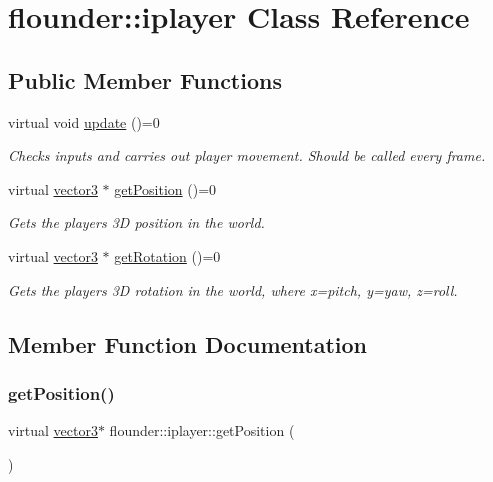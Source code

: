 \hypertarget{classflounder_1_1iplayer}{}\section{flounder\+:\+:iplayer Class Reference}
\label{classflounder_1_1iplayer}
\subsection*{Public Member Functions}
\begin{DoxyCompactItemize}
\item 
virtual void \hyperlink{classflounder_1_1iplayer_a763358c47f9d9433b0ce467418492038}{update} ()=0
\begin{DoxyCompactList}\small\item\em Checks inputs and carries out player movement. Should be called every frame. \end{DoxyCompactList}\item 
virtual \hyperlink{classflounder_1_1vector3}{vector3} $\ast$ \hyperlink{classflounder_1_1iplayer_afb46af362b077d09448e40b8f9d5c734}{get\+Position} ()=0
\begin{DoxyCompactList}\small\item\em Gets the players 3D position in the world. \end{DoxyCompactList}\item 
virtual \hyperlink{classflounder_1_1vector3}{vector3} $\ast$ \hyperlink{classflounder_1_1iplayer_a3f69953d51bc8c697060a3ec52a0fe79}{get\+Rotation} ()=0
\begin{DoxyCompactList}\small\item\em Gets the players 3D rotation in the world, where x=pitch, y=yaw, z=roll. \end{DoxyCompactList}\end{DoxyCompactItemize}


\subsection{Member Function Documentation}
\mbox{\label{classflounder_1_1iplayer_afb46af362b077d09448e40b8f9d5c734}} 
\subsubsection{\texorpdfstring{get\+Position()}{getPosition()}}
{\footnotesize\ttfamily virtual \hyperlink{classflounder_1_1vector3}{vector3}$\ast$ flounder\+::iplayer\+::get\+Position (\begin{DoxyParamCaption}{ }\end{DoxyParamCaption})\hspace{0.3cm}{\ttfamily [pure virtual]}}



